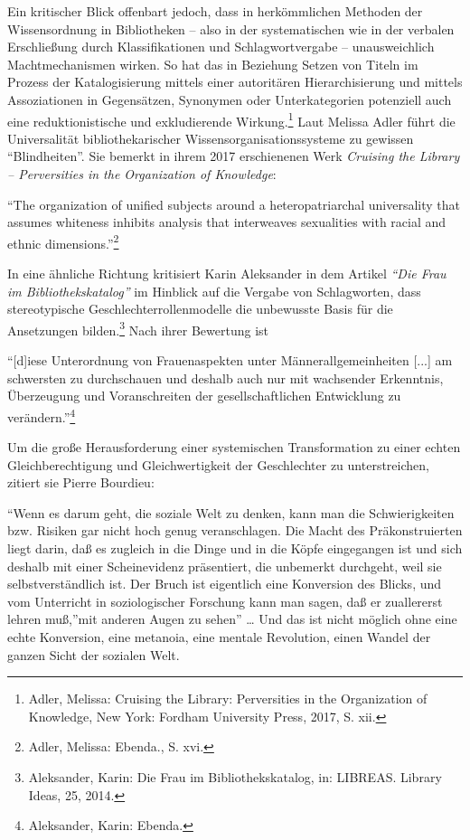 \documentclass[a4paper,
fontsize=11pt,
oneside,
numbers=noperiodatend,
parskip=half-,
bibliography=totoc,
final
]{scrartcl}
\begin{document}
Ein kritischer Blick offenbart jedoch, dass in herkömmlichen Methoden
der Wissensordnung in Bibliotheken -- also in der systematischen wie in
der verbalen Erschließung durch Klassifikationen und Schlagwortvergabe
-- unausweichlich Machtmechanismen wirken. So hat das in Beziehung
Setzen von Titeln im Prozess der Katalogisierung mittels einer
autoritären Hierarchisierung und mittels Assoziationen in Gegensätzen,
Synonymen oder Unterkategorien potenziell auch eine reduktionistische
und exkludierende Wirkung.\footnote{Adler, Melissa: Cruising the
  Library: Perversities in the Organization of Knowledge, New York:
  Fordham University Press, 2017, S. xii.} Laut Melissa Adler führt die
Universalität bibliothekarischer Wissensorganisationssysteme zu gewissen
\enquote{Blindheiten}. Sie bemerkt in ihrem 2017 erschienenen Werk
\emph{Cruising the Library -- Perversities in the Organization of
Knowledge}:

\enquote{The organization of unified subjects around a heteropatriarchal
universality that assumes whiteness inhibits analysis that interweaves
sexualities with racial and ethnic dimensions.}\footnote{Adler, Melissa:
  Ebenda., S. xvi.}

In eine ähnliche Richtung kritisiert Karin Aleksander in dem Artikel
\emph{\enquote{Die Frau im Bibliothekskatalog}} im Hinblick auf die
Vergabe von Schlagworten, dass stereotypische Geschlechterrollenmodelle
die unbewusste Basis für die Ansetzungen bilden.\footnote{Aleksander,
  Karin: Die Frau im Bibliothekskatalog, in: LIBREAS. Library Ideas, 25,
  2014.} Nach ihrer Bewertung ist

\enquote{{[}d{]}iese Unterordnung von Frauenaspekten unter
Männerallgemeinheiten {[}...{]} am schwersten zu durchschauen und
deshalb auch nur mit wachsender Erkenntnis, Überzeugung und
Voranschreiten der gesellschaftlichen Entwicklung zu
verändern.}\footnote{Aleksander, Karin: Ebenda.}

Um die große Herausforderung einer systemischen Transformation zu einer
echten Gleichberechtigung und Gleichwertigkeit der Geschlechter zu
unterstreichen, zitiert sie Pierre Bourdieu:

\enquote{Wenn es darum geht, die soziale Welt zu denken, kann man die
Schwierigkeiten bzw. Risiken gar nicht hoch genug veranschlagen. Die
Macht des Präkonstruierten liegt darin, daß es zugleich in die Dinge und
in die Köpfe eingegangen ist und sich deshalb mit einer Scheinevidenz
präsentiert, die unbemerkt durchgeht, weil sie selbstverständlich ist.
Der Bruch ist eigentlich eine Konversion des Blicks, und vom Unterricht
in soziologischer Forschung kann man sagen, daß er zuallererst lehren
muß,}mit anderen Augen zu sehen'' \ldots{} Und das ist nicht möglich
ohne eine echte Konversion, eine metanoia, eine mentale Revolution,
einen Wandel der ganzen Sicht der sozialen Welt.
\end{document}
